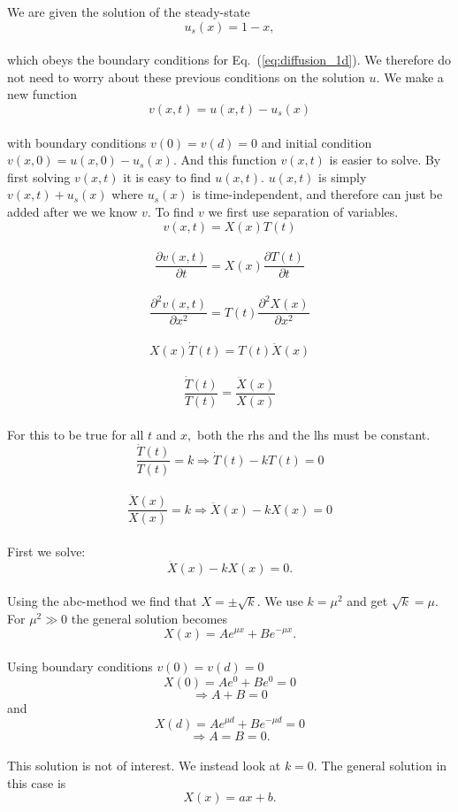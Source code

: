 \documentclass[a4paper,12pt, english]{article}
\begin{document}
We are given the solution of the steady-state 
\\
$$u_s(x) = 1 - x,$$
\\
which obeys the boundary conditions for Eq.~(\ref{eq:diffusion_1d}). We therefore do not need to worry about these previous conditions on the solution $u.$ We make a new function
\\
$$v(x,t) = u(x,t) - u_s(x)$$ 
\\
with boundary conditions $v(0) = v(d) = 0$ and initial condition $v(x,0) = u(x,0) - u_s(x).$ And this function $v(x,t)$ is easier to solve.
By first solving $v(x,t)$ it is easy to find $u(x,t).$ $u(x,t)$ is simply $v(x,t) + u_s(x)$ where $u_s(x)$ is time-independent, and therefore can just be added after we we know $v.$
To find $v$ we first use separation of variables. 
\\
$$v(x,t) = X(x)T(t)$$
\\
$$\frac{\partial v(x,t)}{\partial t} = X(x) \frac{\partial T(t)}{\partial t}$$
\\
$$\frac{\partial^2 v(x,t)}{\partial x^2} = T(t) \frac{\partial^2 X(x)}{\partial x^2}$$
\\
$$X(x)\dot{T}(t) = T(t)\ddot{X}(x)$$
\\
$$\frac{\dot{T}(t)}{T(t)} = \frac{\ddot{X}(x)}{X(x)}$$
\\
For this to be true for all $t$ and $x,$ both the rhs and the lhs must be constant.
\\
$$\frac{\dot{T}(t)}{T(t)} = k \Rightarrow \dot{T}(t) - kT(t) = 0$$
\\
$$\frac{\ddot{X}(x)}{X(x)} = k \Rightarrow \ddot{X}(x) - kX(x) = 0$$
\\
First we solve:
\\
$$\ddot{X}(x) - kX(x) = 0.$$
\\
Using the abc-method we find that $X = \pm \sqrt{k}.$
We use $k = \mu^2$ and get $\sqrt{k} = \mu.$
\\
For $\mu^2 \gg 0$ the general solution becomes
\\
$$X(x) = Ae^{\mu x} + Be^{-\mu x}.$$
\\
Using boundary conditions $v(0) = v(d) = 0$ 
\\
$$X(0) = Ae^0 + Be^0 = 0$$
$$\Rightarrow A + B = 0$$ and
$$X(d) = Ae^{\mu d} + Be^{-\mu d} = 0$$
$$\Rightarrow A = B = 0.$$
\\
This solution is not of interest. We instead look at $k = 0.$ The general solution in this case is
\\
$$X(x) = ax + b.$$
\\
\end{document}
